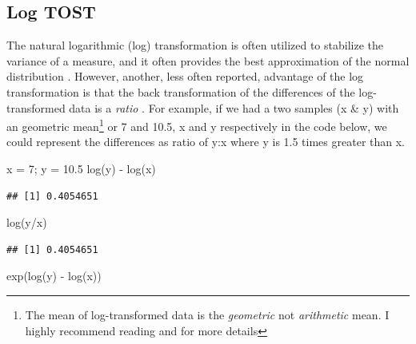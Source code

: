 \documentclass[]{interact}
\theoremstyle{plain}%
\theoremstyle{definition}
\theoremstyle{remark}
\newenvironment{Shaded}{\begin{snugshade}}{\end{snugshade}}
\newcommand{\DecValTok}[1]{\textcolor[rgb]{0.00,0.00,0.81}{#1}}
\newcommand{\FloatTok}[1]{\textcolor[rgb]{0.00,0.00,0.81}{#1}}
\newcommand{\FunctionTok}[1]{\textcolor[rgb]{0.00,0.00,0.00}{#1}}
\newcommand{\NormalTok}[1]{#1}
\newcommand{\OtherTok}[1]{\textcolor[rgb]{0.56,0.35,0.01}{#1}}
\newcommand{\SpecialCharTok}[1]{\textcolor[rgb]{0.00,0.00,0.00}{#1}}
\begin{document}
\newpage

\hypertarget{log-tost}{%
\subsection{Log TOST}\label{log-tost}}

The natural logarithmic (log) transformation is often utilized to
stabilize the variance of a measure, and it often provides the best
approximation of the normal distribution \citep{logtest}. However,
another, less often reported, advantage of the log transformation is
that the back transformation of the differences of the log-transformed
data is a \emph{ratio} \citep{logtest}. For example, if we had a two
samples (x \& y) with an geometric mean\footnote{The mean of
  log-transformed data is the \emph{geometric} not \emph{arithmetic}
  mean. I highly recommend reading \citet{logtest} and
  \citet{caldwell2019basic} for more details} or 7 and 10.5, x and y
respectively in the code below, we could represent the differences as
ratio of y:x where y is 1.5 times greater than x.

\begin{Shaded}
\begin{Highlighting}[]
\NormalTok{x }\OtherTok{=} \DecValTok{7}\NormalTok{; y }\OtherTok{=} \FloatTok{10.5}
\FunctionTok{log}\NormalTok{(y) }\SpecialCharTok{{-}} \FunctionTok{log}\NormalTok{(x)}
\end{Highlighting}
\end{Shaded}

\begin{verbatim}
## [1] 0.4054651
\end{verbatim}

\begin{Shaded}
\begin{Highlighting}[]
\FunctionTok{log}\NormalTok{(y}\SpecialCharTok{/}\NormalTok{x)}
\end{Highlighting}
\end{Shaded}

\begin{verbatim}
## [1] 0.4054651
\end{verbatim}

\begin{Shaded}
\begin{Highlighting}[]
\FunctionTok{exp}\NormalTok{(}\FunctionTok{log}\NormalTok{(y) }\SpecialCharTok{{-}} \FunctionTok{log}\NormalTok{(x))}
\end{Highlighting}
\end{Shaded}
\end{document}
